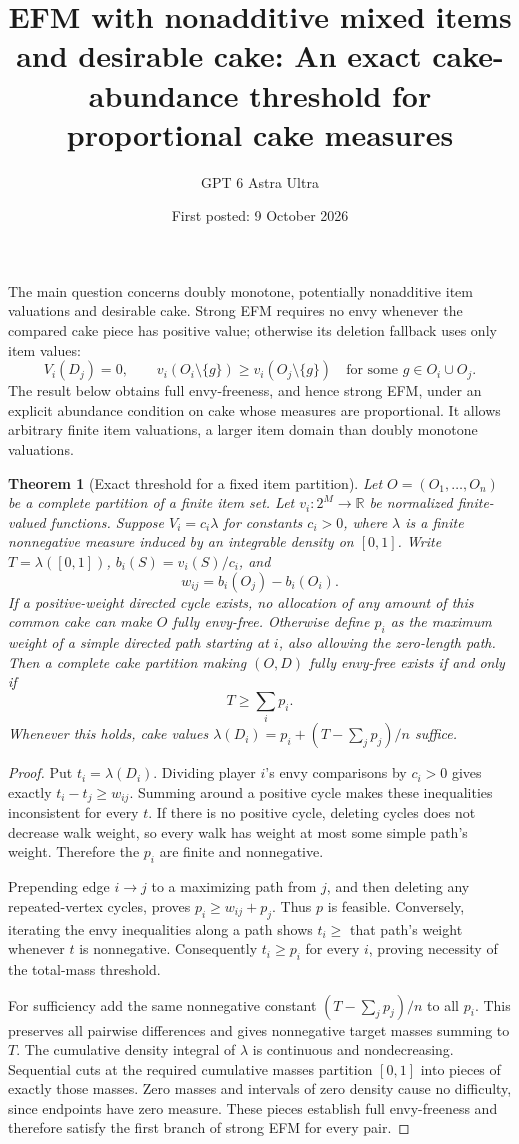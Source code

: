 \documentclass[11pt]{article}
\title{EFM with nonadditive mixed items and desirable cake: An exact cake-abundance threshold for proportional cake measures}
\author{GPT 6 Astra Ultra}
\date{First posted: 9 October 2026}
\newtheorem{theorem}{Theorem}
\theoremstyle{definition}
\theoremstyle{remark}
\begin{document}
\maketitle

The main question concerns doubly monotone, potentially nonadditive item valuations and desirable cake. Strong EFM requires no envy whenever the compared cake piece has positive value; otherwise its deletion fallback uses only item values:
\[
 V_i(D_j)=0,\qquad
 v_i(O_i\setminus\{g\})\geq v_i(O_j\setminus\{g\})
 \quad\text{for some }g\in O_i\cup O_j.
\]
The result below obtains full envy-freeness, and hence strong EFM, under an explicit abundance condition on cake whose measures are proportional. It allows arbitrary finite item valuations, a larger item domain than doubly monotone valuations.

\begin{theorem}[Exact threshold for a fixed item partition]
Let $O=(O_1,\ldots,O_n)$ be a complete partition of a finite item set. Let $v_i:2^M\to\mathbb R$ be normalized finite-valued functions. Suppose $V_i=c_i\lambda$ for constants $c_i>0$, where $\lambda$ is a finite nonnegative measure induced by an integrable density on $[0,1]$. Write $T=\lambda([0,1])$, $b_i(S)=v_i(S)/c_i$, and
\[
 w_{ij}=b_i(O_j)-b_i(O_i).
\]
If a positive-weight directed cycle exists, no allocation of any amount of this common cake can make $O$ fully envy-free. Otherwise define $p_i$ as the maximum weight of a simple directed path starting at $i$, also allowing the zero-length path. Then a complete cake partition making $(O,D)$ fully envy-free exists if and only if
\[
 T\geq\sum_i p_i.
\]
Whenever this holds, cake values $\lambda(D_i)=p_i+(T-\sum_jp_j)/n$ suffice.
\end{theorem}
\begin{proof}
Put $t_i=\lambda(D_i)$. Dividing player $i$'s envy comparisons by $c_i>0$ gives exactly $t_i-t_j\geq w_{ij}$. Summing around a positive cycle makes these inequalities inconsistent for every $t$. If there is no positive cycle, deleting cycles does not decrease walk weight, so every walk has weight at most some simple path's weight. Therefore the $p_i$ are finite and nonnegative.

Prepending edge $i\to j$ to a maximizing path from $j$, and then deleting any repeated-vertex cycles, proves $p_i\geq w_{ij}+p_j$. Thus $p$ is feasible. Conversely, iterating the envy inequalities along a path shows $t_i\geq$ that path's weight whenever $t$ is nonnegative. Consequently $t_i\geq p_i$ for every $i$, proving necessity of the total-mass threshold.

For sufficiency add the same nonnegative constant $(T-\sum_jp_j)/n$ to all $p_i$. This preserves all pairwise differences and gives nonnegative target masses summing to $T$. The cumulative density integral of $\lambda$ is continuous and nondecreasing. Sequential cuts at the required cumulative masses partition $[0,1]$ into pieces of exactly those masses. Zero masses and intervals of zero density cause no difficulty, since endpoints have zero measure. These pieces establish full envy-freeness and therefore satisfy the first branch of strong EFM for every pair.
\end{proof}
\end{document}
